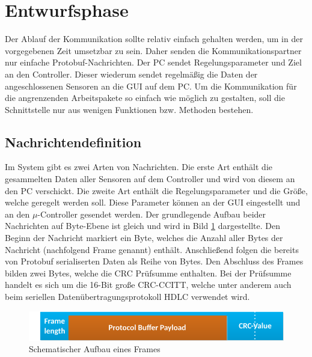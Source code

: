\section{Entwurfsphase}
Der Ablauf der Kommunikation sollte relativ einfach gehalten werden, um in der vorgegebenen Zeit umsetzbar zu sein. Daher senden die Kommunikationspartner nur einfache Protobuf-Nachrichten. Der PC sendet Regelungsparameter und Ziel an den Controller. Dieser wiederum sendet regelmäßig die Daten der angeschlossenen Sensoren an die GUI auf dem PC. Um die Kommunikation für die angrenzenden Arbeitspakete so einfach wie möglich zu gestalten, soll die Schnittstelle nur aus wenigen Funktionen bzw. Methoden bestehen.
\subsection{Nachrichtendefinition}
Im System gibt es zwei Arten von Nachrichten. Die erste Art enthält die gesammelten Daten aller Sensoren auf dem Controller und wird von diesem an den PC verschickt. Die zweite Art enthält die Regelungsparameter und die Größe, welche geregelt werden soll. Diese Parameter können an der GUI eingestellt und an den $\mu$-Controller gesendet werden. Der grundlegende Aufbau beider Nachrichten auf Byte-Ebene ist gleich und wird in Bild \ref{fig:FrameOv} dargestellte. Den Beginn der Nachricht markiert ein Byte, welches die Anzahl aller Bytes der Nachricht (nachfolgend Frame genannt) enthält. Anschließend folgen die bereits von Protobuf serialiserten Daten als Reihe von Bytes. Den Abschluss des Frames bilden zwei Bytes, welche die CRC Prüfsumme enthalten. Bei der Prüfsumme handelt es sich um die 16-Bit große CRC-CCITT, welche unter anderem auch beim seriellen Datenübertragungsprotokoll HDLC verwendet wird.
\begin{figure}[h]
  \includegraphics[width=\textwidth]{MessageFormat}
  \caption{Schematischer Aufbau eines Frames}
  \label{fig:FrameOv}
\end{figure}
